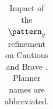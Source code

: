 \documentclass[11pt,landscape]{article}
\begin{document}
\begin{table}[tb]
{\begin{tabular}{|l||cccccc||cccccc||}
        \end{tabular}}
        \caption{Impact of the $\pattern_g$ refinement on Cautious and Brave \pattyd. Planner names are abbreviated.}
        \label{tab:abl-patterng}
        \end{table}
        
\end{document}
